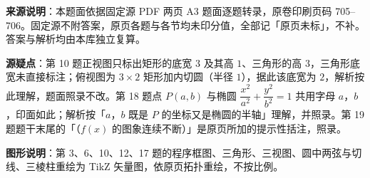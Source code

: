 


\begin{gktip}
\textbf{来源说明}：本题面依据固定源 PDF 两页 A3 题面逐题转录，原卷印刷页码 705–706。固定源不附答案，原页各题与各节均未印分值，全部记「原页未标」，不补。答案与解析均由本库独立复算。

\textbf{源疑点}：第 10 题正视图只标出矩形的底宽 $3$ 及其高 $1$、三角形的高 $3$，三角形底宽未直接标注；俯视图为 $3\times2$ 矩形加内切圆（半径 $1$），据此该底宽为 $2$，解析按此理解，题面照录不改。第 18 题点 $P(a,b)$ 与椭圆 $\dfrac{x^2}{a^2}+\dfrac{y^2}{b^2}=1$ 共用字母 $a$，$b$，印面如此；解析按「$a$，$b$ 既是 $P$ 的坐标又是椭圆的半轴」理解，并照录。第 19 题题干末尾的「（$f(x)$ 的图象连续不断）」是原页所加的提示性括注，照录。

\textbf{图形说明}：第 3、6、10、12、17 题的程序框图、三角形、三视图、圆中两弦与切线、三棱柱重绘为 TikZ 矢量图，依原页拓扑重绘，不按比例。
\end{gktip}


